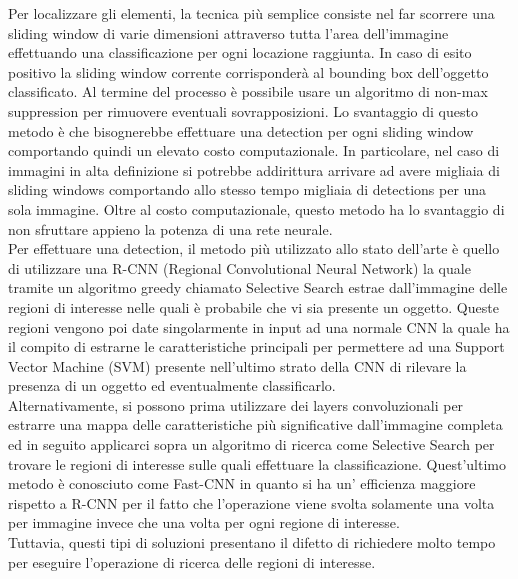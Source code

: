 Per localizzare gli elementi, la tecnica più semplice consiste nel far scorrere una sliding window di varie dimensioni attraverso tutta l'area dell'immagine effettuando una classificazione per ogni locazione raggiunta. In caso di esito positivo la sliding window corrente corrisponderà al bounding box dell'oggetto classificato. Al termine del processo è possibile usare un algoritmo di non-max suppression per rimuovere eventuali sovrapposizioni. Lo svantaggio di questo metodo è che bisognerebbe effettuare una detection per ogni sliding window comportando quindi un elevato costo computazionale. In particolare, nel caso di immagini in alta definizione si potrebbe addirittura arrivare ad avere migliaia di sliding windows comportando allo stesso tempo migliaia di detections per una sola immagine. Oltre al costo computazionale, questo metodo ha lo svantaggio di non sfruttare appieno la potenza di una rete neurale.\\
Per effettuare una detection, il metodo più utilizzato allo stato dell'arte è quello di utilizzare una R-CNN (Regional Convolutional Neural Network) la quale tramite un algoritmo greedy chiamato Selective Search estrae dall'immagine delle regioni di interesse nelle quali è probabile che vi sia presente un oggetto. Queste regioni vengono poi date singolarmente in input ad una normale CNN la quale ha il compito di estrarne le caratteristiche principali per permettere ad una Support Vector Machine (SVM) presente nell'ultimo strato della CNN di rilevare la presenza di un oggetto ed eventualmente classificarlo.\\
Alternativamente, si possono prima utilizzare dei layers convoluzionali per estrarre una mappa delle caratteristiche più significative dall'immagine completa ed in seguito applicarci sopra un algoritmo di ricerca come Selective Search per trovare le regioni di interesse sulle quali effettuare la classificazione. Quest'ultimo metodo è conosciuto come Fast-CNN in quanto si ha un' efficienza maggiore rispetto a R-CNN per il fatto che l'operazione viene svolta solamente una volta per immagine invece che una volta per ogni regione di interesse.\\
Tuttavia, questi tipi di soluzioni presentano il difetto di richiedere molto tempo per eseguire l'operazione di ricerca delle regioni di interesse.\\

